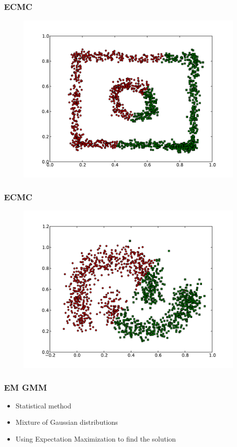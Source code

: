 \documentclass{beamer}
\begin{document}
\begin{frame}
\frametitle{ECMC}
    \begin{figure}[]
    \includegraphics[scale=0.5]{ECMC_circle-weird.pdf}
    \end{figure}
\end{frame}

\begin{frame}
\frametitle{ECMC}
    \begin{figure}[]
    \includegraphics[scale=0.5]{ECMC_half-moons.pdf}
    \end{figure}
\end{frame}



\begin{frame}
\frametitle{EM GMM}
    \begin{itemize}
    	\item Statistical method
   	\item Mixture of Gaussian distributions
   	\item Using Expectation Maximization to find the solution
    \end{itemize}
\end{frame}
\end{document}
